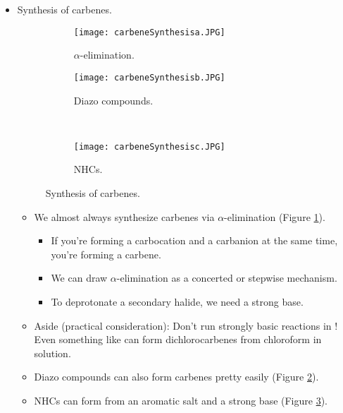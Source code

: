 \documentclass[../notes.tex]{subfiles}
\begin{document}
\begin{itemize}
\begin{itemize}
    \end{itemize}
    \item Synthesis of carbenes.
    \begin{figure}[H]
        \centering
        \begin{subfigure}[b]{0.49\linewidth}
            \centering
            \texttt{[image: carbeneSynthesisa.JPG]}
            \caption{$\alpha$-elimination.}
            \label{fig:carbeneSynthesisa}
        \end{subfigure}
        \begin{subfigure}[b]{0.49\linewidth}
            \centering
            \texttt{[image: carbeneSynthesisb.JPG]}
            \caption{Diazo compounds.}
            \label{fig:carbeneSynthesisb}
        \end{subfigure}\\[2em]
        \begin{subfigure}[b]{0.49\linewidth}
            \centering
            \texttt{[image: carbeneSynthesisc.JPG]}
            \caption{NHCs.}
            \label{fig:carbeneSynthesisc}
        \end{subfigure}
        \caption{Synthesis of carbenes.}
        \label{fig:carbeneSynthesis}
    \end{figure}
    \begin{itemize}
        \item We almost always synthesize carbenes via $\alpha$-elimination (Figure \ref{fig:carbeneSynthesisa}).
        \begin{itemize}
            \item If you're forming a carbocation and a carbanion at the same time, you're forming a carbene.
            \item We can draw $\alpha$-elimination as a concerted or stepwise mechanism.
            \item To deprotonate a secondary halide, we need a strong base.
        \end{itemize}
        \item Aside (practical consideration): Don't run strongly basic reactions in ! Even something like  can form dichlorocarbenes from chloroform in solution.
        \item Diazo compounds can also form carbenes pretty easily (Figure \ref{fig:carbeneSynthesisb}).
        \item NHCs can form from an aromatic salt and a strong base (Figure \ref{fig:carbeneSynthesisc}).

\end{itemize}
\end{itemize}
\end{document}
